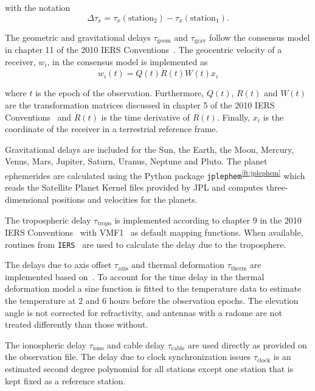 \documentclass[natbib,twocolumn,twoside]{svmultiag}
\begin{document}
\noindent with the notation
\begin{equation}
  \Delta\tau_{x} = \tau_{x}(\text{station}_2) - \tau_{x}(\text{station}_1) .
\end{equation}

\noindent The geometric and gravitational delays $\tau_\text{{geom}}$ and
$\tau_\text{{grav}}$ follow the consensus model in chapter 11 of the 2010 IERS
Conventions~\citep{iers2010}. The geocentric velocity of a receiver, $w_i$, in
the consensus model is implemented as
\begin{equation}
  w_i(t) = Q(t) \dot{R}(t) W(t) x_i
\end{equation}

\noindent where $t$ is the epoch of the observation. Furthermore, $Q(t)$, $R(t)$
and $W(t)$ are the transformation matrices discussed in chapter 5 of the 2010
IERS Conventions~\citep{iers2010} and $\dot{R}(t)$ is the time derivative of
$R(t)$. Finally, $x_i$ is the coordinate of the receiver in a terrestrial
reference frame.

Gravitational delays are included for the Sun, the Earth, the Moon, Mercury,
Venus, Mars, Jupiter, Saturn, Uranus, Neptune and Pluto. The planet ephemerides
are calculated using the Python package
\texttt{jplephem}\textsuperscript{\ref{ft:jplephem}} which reads the Satellite
Planet Kernel files provided by JPL and computes three-dimensional positions and
velocities for the planets.

The tropospheric delay $\tau_{\text{tropo}}$ is implemented according to chapter
9 in the 2010 IERS Conventions~\citep{iers2010} with VMF1~\citep{boehm2006a}
as default mapping functions. When available, routines from
\texttt{IERS}~\citep{iers_software} are used to calculate the delay due to the
troposphere.

The delays due to axis offset $\tau_{\text{axis}}$ and thermal deformation
$\tau_{\text{therm}}$ are implemented based on~\citep{nothnagel2009}. To account
for the time delay in the thermal deformation model a sine function is fitted to
the temperature data to estimate the temperature at 2 and 6 hours before the
observation epochs. The elevation angle is not corrected for refractivity, and
antennas with a radome are not treated differently than those without.

The ionospheric delay $\tau_{\text{iono}}$ and cable delay $\tau_{\text{cable}}$
are used directly as provided on the observation file. The delay due to clock
synchronization issues $\tau_{\text{clock}}$ is an estimated second degree
polynomial for all stations except one station that is kept fixed as a reference
station.
\end{document}
